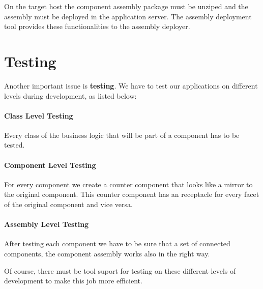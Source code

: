 On the target host the component assembly
package must be unziped and the assembly must be deployed in the
application server. The assembly deployment tool provides these
functionalities to the assembly deployer.

\section{Testing}

Another important issue is {\bf testing}. We have to test our applications on
different levels during development, as listed below:

\paragraph{Class Level Testing}

Every class of the business logic that will be part of a component has to be
tested.

\paragraph{Component Level Testing}

For every component we create a counter component that looks like a mirror to
the original component. This counter component has an receptacle for every facet
of the original component and vice versa.

\paragraph{Assembly Level Testing}

After testing each component we have to be sure that a set of connected
components, the component assembly works also in the right way.

Of course, there must be tool suport for testing on these different levels of
development to make this job more efficient.
